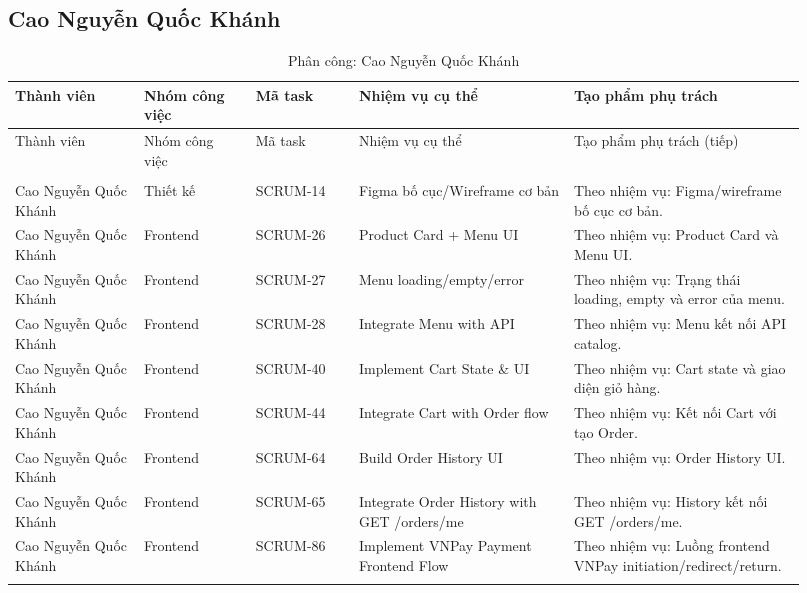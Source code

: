 \subsection{Cao Nguyễn Quốc Khánh}
\begingroup\small
\setlength{\tabcolsep}{3pt}\renewcommand{\arraystretch}{1.15}
\begin{longtable}{>{\raggedright\arraybackslash}p{0.15\linewidth}>{\raggedright\arraybackslash}p{0.13\linewidth}>{\raggedright\arraybackslash}p{0.12\linewidth}>{\raggedright\arraybackslash}p{0.25\linewidth}>{\raggedright\arraybackslash}p{0.27\linewidth}}
\caption{Phân công: Cao Nguyễn Quốc Khánh}\label{tab:auto-task-allocation-2}\\
\toprule Thành viên & Nhóm công việc & Mã task & Nhiệm vụ cụ thể & Tạo phẩm phụ trách \\ \midrule\endfirsthead
\toprule Thành viên & Nhóm công việc & Mã task & Nhiệm vụ cụ thể & Tạo phẩm phụ trách (tiếp) \\ \midrule\endhead
\midrule\multicolumn{5}{r}{\small Còn tiếp ở trang sau}\\\endfoot
\bottomrule\endlastfoot
Cao Nguyễn Quốc Khánh & Thiết kế & SCRUM-14 & Figma bố cục/Wireframe cơ bản & Theo nhiệm vụ: Figma/wireframe bố cục cơ bản. \\ \addlinespace[3pt]
Cao Nguyễn Quốc Khánh & Frontend & SCRUM-26 & Product Card + Menu UI & Theo nhiệm vụ: Product Card và Menu UI. \\ \addlinespace[3pt]
Cao Nguyễn Quốc Khánh & Frontend & SCRUM-27 & Menu loading/empty/error & Theo nhiệm vụ: Trạng thái loading, empty và error của menu. \\ \addlinespace[3pt]
Cao Nguyễn Quốc Khánh & Frontend & SCRUM-28 & Integrate Menu with API & Theo nhiệm vụ: Menu kết nối API catalog. \\ \addlinespace[3pt]
Cao Nguyễn Quốc Khánh & Frontend & SCRUM-40 & Implement Cart State \& UI & Theo nhiệm vụ: Cart state và giao diện giỏ hàng. \\ \addlinespace[3pt]
Cao Nguyễn Quốc Khánh & Frontend & SCRUM-44 & Integrate Cart with Order flow & Theo nhiệm vụ: Kết nối Cart với tạo Order. \\ \addlinespace[3pt]
Cao Nguyễn Quốc Khánh & Frontend & SCRUM-64 & Build Order History UI & Theo nhiệm vụ: Order History UI. \\ \addlinespace[3pt]
Cao Nguyễn Quốc Khánh & Frontend & SCRUM-65 & Integrate Order History with GET /orders/me & Theo nhiệm vụ: History kết nối GET /orders/me. \\ \addlinespace[3pt]
Cao Nguyễn Quốc Khánh & Frontend & SCRUM-86 & Implement VNPay Payment Frontend Flow & Theo nhiệm vụ: Luồng frontend VNPay initiation/redirect/return. \\ \addlinespace[3pt]

\end{longtable}
